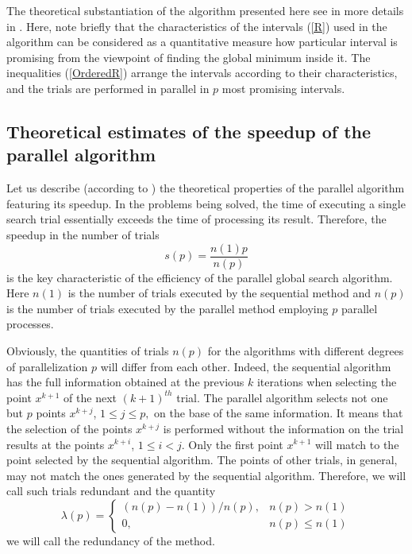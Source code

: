 \documentclass[runningheads]{llncs}
\begin{document}
The theoretical substantiation of the algorithm presented here see in more details in \cite{Strongin2000}. Here, note briefly that the characteristics of the intervals (\ref{R}) used in the algorithm can be considered as a quantitative measure how particular interval is promising from the viewpoint of finding the global minimum inside it. The inequalities (\ref{OrderedR}) arrange the intervals according to their characteristics, and the trials are performed in parallel in $p$ most promising intervals.

\subsection{Theoretical estimates of the speedup of the parallel algorithm}

Let us describe (according to \cite{Strongin2000}) the theoretical properties of the parallel algorithm featuring its speedup. In the problems being solved, the time of executing a single search trial essentially exceeds the time of processing its result. Therefore, the speedup in the number of trials 
\begin{equation} \label{par_trl_ref}
s(p) = \frac{n(1)p}{n(p)}
\end{equation}
is the key characteristic of the efficiency of the parallel global search algorithm.
Here $n(1)$ is the number of trials executed by the sequential method and $n(p)$ is the number of trials executed by the parallel method employing $p$ parallel processes.

Obviously, the quantities of trials $n(p)$ for the algorithms with different degrees of parallelization $p$ will differ from each other. Indeed, the sequential algorithm has the full information obtained at the previous $k$ iterations when selecting the point $x^{k+1}$ of the next $(k+1)^{th}$ trial. The parallel algorithm selects not one but $p$ points $x^{k+j}$, $1 \leq j \leq p,$ on the base of the same information. It means that the selection of the points $x^{k+j}$ is performed without the information on the trial results at the points $x^{k+i}$, $1 \leq i < j$. Only the first point $x^{k+1}$ will match to the point selected by the sequential algorithm. The points of other trials, in general, may not match the ones generated by the sequential algorithm. Therefore, we will call such trials redundant and the quantity
\begin{displaymath}
\lambda(p) = \left\{ \begin{array}{ll}
                (n(p) - n(1)) / n(p), & \textrm{$n(p) > n(1)$}\\
                0, & \textrm{$n(p) \leq n(1)$}
  \end{array} \right.
\end{displaymath}
we will call the redundancy of the method.
\end{document}
